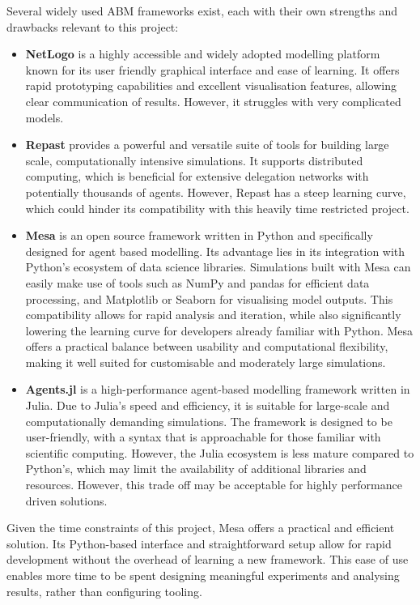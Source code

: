 Several widely used ABM frameworks exist, each with their own strengths and drawbacks relevant to this project:
\begin{itemize}
  \item \textbf{NetLogo} \citep{netlogo} is a highly accessible and widely adopted modelling platform known for its user friendly graphical interface and ease of learning. It offers rapid prototyping capabilities and excellent visualisation features, allowing clear communication of results. However, it struggles with very complicated models.
  \item \textbf{Repast} \citep{repast} provides a powerful and versatile suite of tools for building large scale, computationally intensive simulations. It supports distributed computing, which is beneficial for extensive delegation networks with potentially thousands of agents. However, Repast has a steep learning curve, which could hinder its compatibility with this heavily time restricted project.
  \item \textbf{Mesa} \citep{kazil_utilizing_2020} is an open source framework written in Python and specifically designed for agent based modelling. Its advantage lies in its integration with Python's ecosystem of data science libraries. Simulations built with Mesa can easily make use of tools such as NumPy and pandas for efficient data processing, and Matplotlib or Seaborn for visualising model outputs. This compatibility allows for rapid analysis and iteration, while also significantly lowering the learning curve for developers already familiar with Python. Mesa offers a practical balance between usability and computational flexibility, making it well suited for customisable and moderately large simulations.
  \item \textbf{Agents.jl} \citep{agentsjl} is a high-performance agent-based modelling framework written in Julia. Due to Julia's speed and efficiency, it is suitable for large-scale and computationally demanding simulations. The framework is designed to be user-friendly, with a syntax that is approachable for those familiar with scientific computing. However, the Julia ecosystem is less mature compared to Python's, which may limit the availability of additional libraries and resources. However, this trade off may be acceptable for highly performance driven solutions.
\end{itemize}
Given the time constraints of this project, Mesa offers a practical and efficient solution. Its Python-based interface and straightforward setup allow for rapid development without the overhead of learning a new framework. This ease of use enables more time to be spent designing meaningful experiments and analysing results, rather than configuring tooling.
